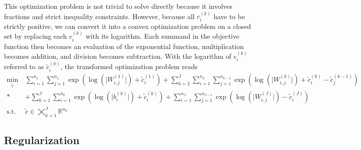 %
This optimization problem is not trivial to solve directly because it involves fractions and strict inequality constraints. However, because all $c_i^{(k)}$ have to be strictly positive, we can convert it into a convex optimization problem on a closed set by replacing each $c_i^{(k)}$ with its logarithm. Each summand in the objective function then becomes an evaluation of the exponential function, multiplication becomes addition, and division becomes subtraction. With the logarithm of $c^{(k)}_i$  referred to as $\tilde{c}^{(k)}_i$, the transformed optimization problem reads
%
\begin{equation}\label{prob:scaling}
    \begin{aligned}
        \min_{\tilde{c}}\ & \sum_{i=1}^{n_1} \sum_{j=1}^{n_x} \exp \left( \log \left( \lvert W_{i,j}^{(1)} \rvert\right) + \tilde{c}_i^{(1)} \right)   + \sum_{k=2}^{J} \sum_{i=1}^{n_k} \sum_{j=1}^{n_{k-1}} \exp \left( \log \left( \lvert W_{i,j}^{(k)} \rvert \right)+ \tilde{c}_i^{(k)} - \tilde{c}_j^{(k-1)} \right)\\*
        & + \displaystyle \sum_{k=1}^{J} \sum_{i=1}^{n_k} \exp \left( \log \left( \lvert b_i^{(k)} \rvert \right) +  \tilde{c}_i^{(k)} \right) + \sum_{i=1}^{n_J} \sum_{j=1}^{n_{J-1}}  \exp \left( \log\left(\lvert W_{i,j}^{(J)} \rvert \right) - \tilde{c}_i^{(J)} \right) \\
        \textrm{s.t.}\ & \tilde{c} \in \bigtimes_{k=1}^J \mathbb{R}^{n_k}
    \end{aligned}
\end{equation}
%


\subsection{Regularization} \label{sec:regularization}

